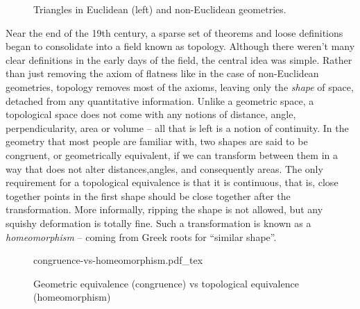 \begin{figure}[ht]
	\centering
	\medskip
	\caption{Triangles in Euclidean (left) and non-Euclidean geometries.}
\end{figure}


Near the end of the 19th century, a sparse set of theorems and loose definitions began to consolidate into a field known as topology. Although there weren't many clear definitions in the early days of the field, the central idea was simple. Rather than just removing the axiom of flatness like in the case of non-Euclidean geometries, topology removes most of the axioms, leaving only the \emph{shape} of space, detached from any quantitative information. Unlike a geometric space, a topological space does not come with any notions of distance, angle, perpendicularity, area or volume -- all that is left is a notion of continuity.
In the geometry that most people are familiar with, two shapes are said to be congruent, or geometrically equivalent, if we can transform between them in a way that does not alter distances,angles, and consequently areas.
The only requirement for a topological equivalence is that it is continuous, that is, close together points in the first shape should be close together after the transformation. More informally, ripping the shape is not allowed, but any squishy deformation is totally fine. Such a transformation is known as a \emph{homeomorphism} -- coming from Greek roots for ``similar shape''.
\begin{figure}[ht]
	\centering
	{congruence-vs-homeomorphism.pdf_tex}
	\caption{Geometric equivalence (congruence) vs topological equivalence (homeomorphism)}
\end{figure}

